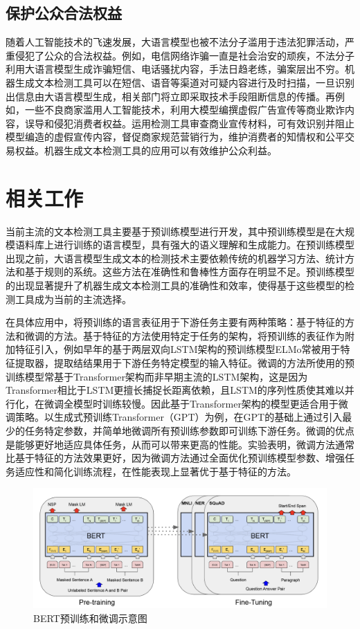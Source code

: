\documentclass[a4paper]{report}
\begin{document}
\subsection{保护公众合法权益}
随着人工智能技术的飞速发展，大语言模型也被不法分子滥用于违法犯罪活动，严重侵犯了公众的合法权益。例如，电信网络诈骗一直是社会治安的顽疾，不法分子利用大语言模型生成诈骗短信、电话骚扰内容，手法日趋老练，骗案层出不穷。机器生成文本检测工具可以在短信、语音等渠道对可疑内容进行及时扫描，一旦识别出信息由大语言模型生成，相关部门将立即采取技术手段阻断信息的传播。再例如，一些不良商家滥用人工智能技术，利用大模型编撰虚假广告宣传等商业欺诈内容，误导和侵犯消费者权益。运用检测工具审查商业宣传材料，可有效识别并阻止模型编造的虚假宣传内容，督促商家规范营销行为，维护消费者的知情权和公平交易权益。机器生成文本检测工具的应用可以有效维护公众利益。




\section{相关工作}
当前主流的文本检测工具主要基于预训练模型进行开发，其中预训练模型是在大规模语料库上进行训练的语言模型，具有强大的语义理解和生成能力。在预训练模型出现之前，大语言模型生成文本的检测技术主要依赖传统的机器学习方法、统计方法和基于规则的系统。这些方法在准确性和鲁棒性方面存在明显不足。预训练模型的出现显著提升了机器生成文本检测工具的准确性和效率，使得基于这些模型的检测工具成为当前的主流选择。

在具体应用中，将预训练的语言表征用于下游任务主要有两种策略：基于特征的方法和微调的方法。基于特征的方法使用特定于任务的架构，将预训练的表征作为附加特征引入，例如早年的基于两层双向LSTM架构的预训练模型ELMo\cite{peters2018deep}常被用于特征提取器，提取结结果用于下游任务特定模型的输入特征。微调的方法所使用的预训练模型常基于Transformer架构而非早期主流的LSTM架构，这是因为Transformer相比于LSTM更擅长捕捉长距离依赖，且LSTM的序列性质使其难以并行化，在微调全模型时训练较慢。因此基于Transformer架构的模型更适合用于微调策略。以生成式预训练Transformer（GPT）为例，在GPT的基础上通过引入最少的任务特定参数，并简单地微调所有预训练参数即可训练下游任务。微调的优点是能够更好地适应具体任务，从而可以带来更高的性能。实验表明，微调方法通常比基于特征的方法效果更好，因为微调方法通过全面优化预训练模型参数、增强任务适应性和简化训练流程，在性能表现上显著优于基于特征的方法。


\begin{figure}[H]
	\centering
	\includegraphics[width=1\textwidth]{Pre-training & Fine-Tuning.png}
	\caption{BERT预训练和微调示意图}
	\label{Pre-training & Fine-Tuning}
\end{figure}
\end{document}
